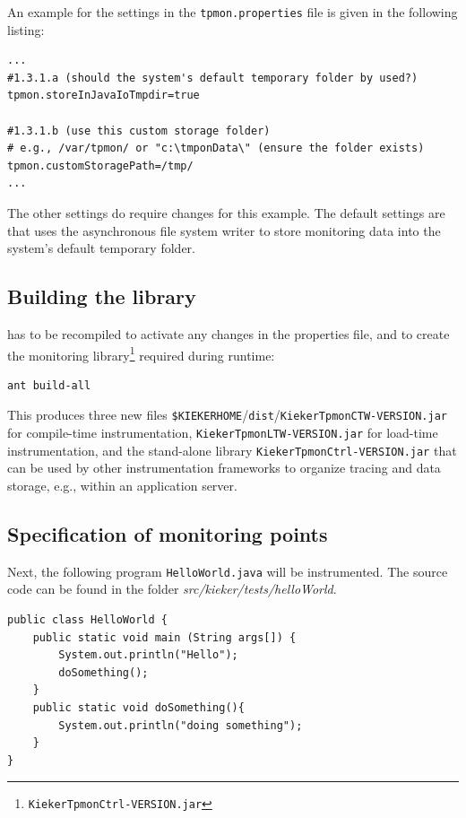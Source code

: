 \documentclass[a4paper,12pt]{scrartcl}
\begin{document}
An example for the settings in the \texttt{tpmon.properties} file is given in the following listing:
\begin{lstlisting}[caption={Linux/Unix: Specification of the monitoring data storage location}]
...
#1.3.1.a (should the system's default temporary folder by used?)
tpmon.storeInJavaIoTmpdir=true

#1.3.1.b (use this custom storage folder)
# e.g., /var/tpmon/ or "c:\tmponData\" (ensure the folder exists)
tpmon.customStoragePath=/tmp/
...
\end{lstlisting}

The other settings do require changes for this example. The default settings are that \tpmon{} uses the asynchronous file system writer to store monitoring data into the system's default temporary folder.

\subsection{Building the \tpmon{} library}
\tpmon{} has to be recompiled to activate any changes in the properties file, and to create the monitoring library\footnote{\texttt{KiekerTpmonCtrl-VERSION.jar}} required during runtime:
\begin{lstlisting}[]
ant build-all
\end{lstlisting}
This produces three new files \texttt{\$KIEKERHOME}/\texttt{dist}/\texttt{KiekerTpmonCTW-VERSION.jar} for compile-time instrumentation, \texttt{KiekerTpmonLTW-VERSION.jar} for load-time instrumentation, and the stand-alone library \texttt{KiekerTpmonCtrl-VERSION.jar} that can be used by other instrumentation frameworks to organize tracing and data storage, e.g., within an application server.

\subsection{Specification of monitoring points}\label{sec.tutorial.annotation}
Next, the following program \texttt{HelloWorld.java} will be instrumented. The source code can be found in the folder \textit{src/kieker/tests/helloWorld}.
\begin{lstlisting}[caption={\texttt{HelloWorld.java}},label={lst1}]
public class HelloWorld {
	public static void main (String args[]) {
		System.out.println("Hello");
		doSomething();
	}
	public static void doSomething(){
		System.out.println("doing something");
	}
}
\end{lstlisting}
\end{document}
